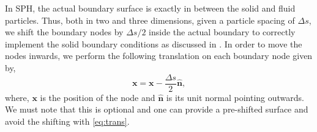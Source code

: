 \documentclass[preprint,12pt]{elsarticle}
\newcommand{\ten}[1]{\ensuremath{\mathbf{#1}}}
\begin{document}
In SPH, the actual boundary surface is exactly in between the solid and fluid
particles. Thus, both in two and three dimensions, given a particle spacing of
$\Delta s$, we shift the boundary nodes by $\Delta s / 2$ inside the actual
boundary to correctly implement the solid boundary conditions as discussed in
\citet{marrone-deltasph:cmame:2011}. In order to move the nodes inwards, we
perform the following translation on each boundary node given by,
\begin{equation}
  \label{eq:trans}
  \ten{x} = \ten{x} - \frac{\Delta s}{2} \hat{\ten{n}},
\end{equation}
where, $\ten{x}$ is the position of the node and $\hat{\ten{n}}$ is its unit
normal pointing outwards. We must note that this is optional and one can
provide a pre-shifted surface and avoid the shifting with \cref{eq:trans}.
\end{document}
